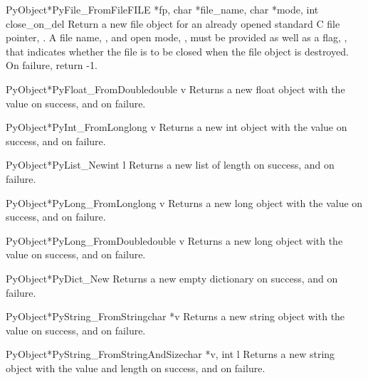 \documentclass[twoside]{report}
\begin{document}
\begin{cfuncdesc}{PyObject*}{PyFile_FromFile}{FILE *fp, char *file_name, char *mode, int close_on_del}
Return a new file object for an already opened standard C
file pointer, .  A file name, , and open mode,
, must be provided as well as a flag, , that
indicates whether the file is to be closed when the file
object is destroyed.  On failure, return -1.
\end{cfuncdesc}

\begin{cfuncdesc}{PyObject*}{PyFloat_FromDouble}{double v}
Returns a new float object with the value  on success, and
\NULL{} on failure.
\end{cfuncdesc}

\begin{cfuncdesc}{PyObject*}{PyInt_FromLong}{long v}
Returns a new int object with the value  on success, and
\NULL{} on failure.
\end{cfuncdesc}

\begin{cfuncdesc}{PyObject*}{PyList_New}{int l}
Returns a new list of length  on success, and \NULL{} on
failure.
\end{cfuncdesc}

\begin{cfuncdesc}{PyObject*}{PyLong_FromLong}{long v}
Returns a new long object with the value  on success, and
\NULL{} on failure.
\end{cfuncdesc}

\begin{cfuncdesc}{PyObject*}{PyLong_FromDouble}{double v}
Returns a new long object with the value  on success, and
\NULL{} on failure.
\end{cfuncdesc}

\begin{cfuncdesc}{PyObject*}{PyDict_New}{}
Returns a new empty dictionary on success, and \NULL{} on
failure.
\end{cfuncdesc}

\begin{cfuncdesc}{PyObject*}{PyString_FromString}{char *v}
Returns a new string object with the value  on success, and
\NULL{} on failure.
\end{cfuncdesc}

\begin{cfuncdesc}{PyObject*}{PyString_FromStringAndSize}{char *v, int l}
Returns a new string object with the value  and length 
on success, and \NULL{} on failure.
\end{cfuncdesc}
\end{document}
